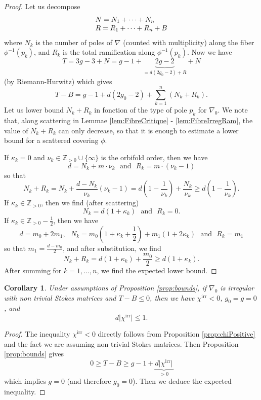 \documentclass[12]{amsart}
\newtheorem{cor}[thm]{Corollary}
\begin{document}
\begin{proof}Let us decompose
$$\begin{matrix}
N=N_1+\cdots+N_n\hfill\hfill\\
R=R_1+\cdots+R_n+B
\end{matrix}$$
where $N_k$ is the number of poles of $\nabla$ (counted with multiplicity) along the fiber $\phi^{-1}(p_k)$,
and $R_k$ is the total ramification along $\phi^{-1}(p_k)$. Now we have
$$T=3g-3+N=g-1+\underbrace{2g-2}_{=d(2g_0-2)+R}+N$$
(by Riemann-Hurwitz) which gives
$$T-B=g-1+d(2g_0-2)+\sum_{k=1}^n(N_k+R_k).$$
Let us lower bound $N_k+R_k$ in fonction of the type of pole $p_k$ for $\nabla_0$.
We note that, along scattering in Lemmae \ref{lem:FibreCritique} - \ref{lem:FibreIrregRam},
the value of $N_k+R_k$ can only decrease, so that it is enough to estimate a lower bound 
for a scattered covering $\phi$.

If $\kappa_k=0$ and $\nu_k\in\mathbb Z_{>0}\cup\{\infty\}$ is the orbifold order, 
then we have
$$d=N_k+m\cdot\nu_k\ \ \ \text{and}\ \ \ R_k=m\cdot(\nu_k-1)$$
so that 
$$N_k+R_k=N_k+\frac{d-N_k}{\nu_k}(\nu_k-1)
=d\left(1-\frac{1}{\nu_k}\right)+\frac{N_k}{\nu_k}\ge d\left(1-\frac{1}{\nu_k}\right).$$
If $\kappa_k\in\mathbb Z_{>0}$, then we find (after scattering)
$$N_k=d(1+\kappa_k)\ \ \ \text{and}\ \ \ R_k=0.$$
If $\kappa_k\in\mathbb Z_{>0}-\frac{1}{2}$, then we have
$$d=m_0+2m_1,\ \ \ N_k=m_0(1+\kappa_k+\frac{1}{2})+m_1(1+2\kappa_k)\ \ \ \text{and}\ \ \ R_k=m_1$$
so that $m_1=\frac{d-m_0}{2}$, and after substitution, we find
$$N_k+R_k=d\left(1+\kappa_k\right)+\frac{m_0}{2}\ge d\left(1+\kappa_k\right).$$
After summing for $k=1,\ldots,n$, we find the expected lower bound.
\end{proof}

\begin{cor}Under assumptions of Proposition \ref{prop:bounds}, if $\nabla_0$ is irregular with non trivial Stokes matrices
and $T-B\le0$, then we have $\chi^{\mathrm{irr}}<0$, $g_0=g=0$,  and 
$$d\vert \chi^{\mathrm{irr}}\vert\le 1.$$
\end{cor}

\begin{proof}The inequality $\chi^{\mathrm{irr}}<0$ directly follows from Proposition \ref{prop:chiPositive}
and the fact we are assuming non trivial Stokes matrices. Then Proposition \ref{prop:bounds} gives
$$0\ge T-B\ge g-1+\underbrace{d\vert \chi^{\mathrm{irr}}\vert}_{>0}$$
which implies $g=0$ (and therefore $g_0=0$). Then we deduce the expected inequality.
\end{proof}
\end{document}
